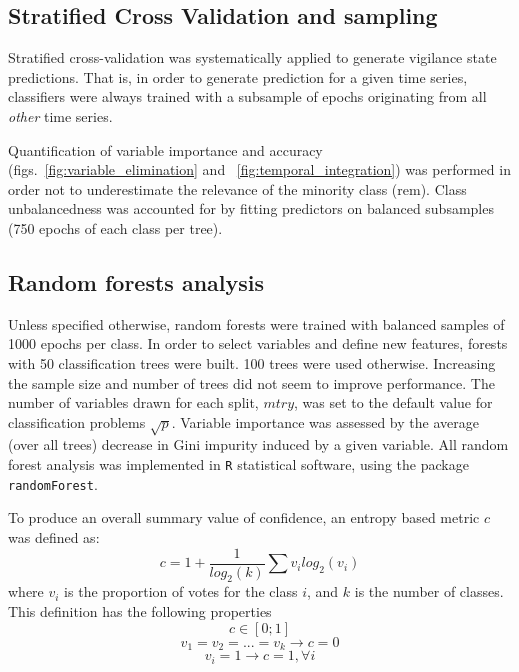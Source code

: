 \subsection{Stratified Cross Validation and sampling}


Stratified cross-validation was systematically applied to generate vigilance state predictions.
That is, in order to generate prediction for a given time series, classifiers were always trained with a subsample of epochs
originating from all \emph{other} time series.

Quantification of variable importance and accuracy (figs.~\ref{fig:variable_elimination} and ~\ref{fig:temporal_integration}) was performed in order not to underestimate the relevance of the minority class (\gls{rem}).
Class  unbalancedness was accounted for by fitting predictors on balanced subsamples (750 epochs of each class per tree).


\subsection{Random forests analysis}
Unless specified otherwise, random forests \citationneeded{} were trained with balanced samples of 1000 epochs per class.
In order to select variables and define new features, forests with 50 classification trees were built.
100 trees were used otherwise.
Increasing the sample size and number of trees did not seem to improve performance.
The number of variables drawn for each split, $mtry$, was set to the default value for classification problems $\sqrt{p}$.
Variable importance was assessed by the average (over all trees) decrease in Gini impurity induced by a given variable.
All random forest analysis was implemented in \texttt{R} \citationneeded{} statistical software, using the package \texttt{randomForest}.

To produce an overall summary value of confidence, an entropy based metric $c$ was defined as:
\begin{equation}
c = 1 + \frac{1}{log_2(k)}\sum{v_i  log_2(v_i)}
\label{eq:entropy}
\end{equation}
where $v_i$ is the proportion of votes for the class $i$, and $k$ is the number of classes. 
This definition has the following properties 
\[
c \in [0;1]
\]
\[
v_1 = v_2 = ... = v_k \rightarrow c = 0
\]
\[
v_i = 1 \rightarrow c = 1 , \forall i
\]




